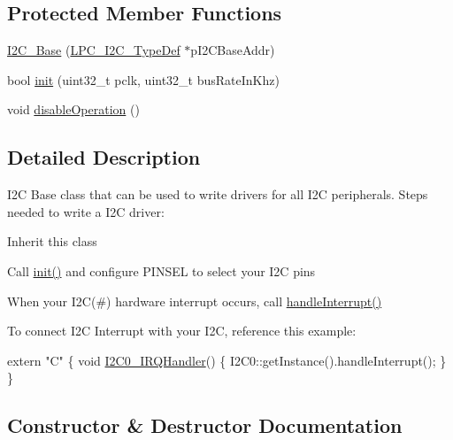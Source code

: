 \subsection*{Protected Member Functions}
\begin{DoxyCompactItemize}
\item 
\hyperlink{classI2C__Base_a12caefb41201a7eefe2bc511e48bbd8f}{I2\+C\+\_\+\+Base} (\hyperlink{structLPC__I2C__TypeDef}{L\+P\+C\+\_\+\+I2\+C\+\_\+\+Type\+Def} $\ast$p\+I2\+C\+Base\+Addr)
\item 
bool \hyperlink{classI2C__Base_aa7dd7ef20cedca783ff49413d5765fac}{init} (uint32\+\_\+t pclk, uint32\+\_\+t bus\+Rate\+In\+Khz)
\item 
void \hyperlink{classI2C__Base_a44944d722c91374502bba78dbe27d923}{disable\+Operation} ()
\end{DoxyCompactItemize}


\subsection{Detailed Description}
I2C Base class that can be used to write drivers for all I2C peripherals. Steps needed to write a I2C driver\+:
\begin{DoxyItemize}
\item Inherit this class
\item Call \hyperlink{classI2C__Base_aa7dd7ef20cedca783ff49413d5765fac}{init()} and configure P\+I\+N\+S\+EL to select your I2C pins
\item When your I2C(\#) hardware interrupt occurs, call \hyperlink{classI2C__Base_a91503a44a5f9ff228354245c8c6ec9bc}{handle\+Interrupt()}
\end{DoxyItemize}

To connect I2C Interrupt with your I2C, reference this example\+: 
\begin{DoxyCode}
\textcolor{keyword}{extern} \textcolor{stringliteral}{"C"}
 \{
    \textcolor{keywordtype}{void} \hyperlink{startup_8cpp_a4d1f9a7702a354022ff322a565f8c82b}{I2C0\_IRQHandler}()
    \{
        I2C0::getInstance().handleInterrupt();
    \}
 \}
\end{DoxyCode}
 

\subsection{Constructor \& Destructor Documentation}

